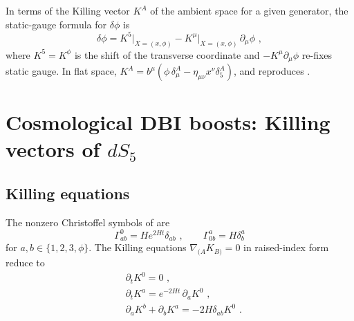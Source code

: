 \documentclass[11pt]{article}
\begin{document}
In terms of the Killing vector $K^A$ of the ambient space for a given generator, the static-gauge
formula for $\delta\phi$ is
\begin{equation}
\label{eq:static-gauge-formula}
\delta\phi = K^5\big|_{X=(x,\phi)} - K^\mu\big|_{X=(x,\phi)}\,\partial_\mu\phi \,\,,
\end{equation}
where $K^5 = K^\phi$ is the shift of the transverse coordinate and $-K^\mu\partial_\mu\phi$
re-fixes static gauge.  In flat space, $K^A = b^\mu(\phi\,\delta^A_\mu - \eta_{\mu\nu}x^\nu\delta^A_5)$,
and  reproduces .

\section{\texorpdfstring{Cosmological DBI boosts: Killing vectors of $dS_5$}{Cosmological DBI boosts: Killing vectors of dS5}}
\label{sec:cosmo-dbi-boost}

\subsection{Killing equations}

The nonzero Christoffel symbols of  are
\begin{equation}
\label{eq:christoffels}
\Gamma^0_{ab} = He^{2Ht}\delta_{ab} \,\,, \qquad \Gamma^a_{0b} = H\delta^a_b
\end{equation}
for $a, b \in \{1,2,3,\phi\}$.  The Killing equations $\nabla_{(A}K_{B)} = 0$ in raised-index
form reduce to
\begin{subequations}
\label{eq:killing-eqs}
\begin{align}
& \partial_t K^0 = 0 \,\,, \label{eq:k1} \\
& \partial_t K^a = e^{-2Ht}\,\partial_a K^0 \,\,, \label{eq:k2} \\
& \partial_a K^b + \partial_b K^a = -2H\delta_{ab} K^0 \,\,. \label{eq:k3}
\end{align}
\end{subequations}
\end{document}
